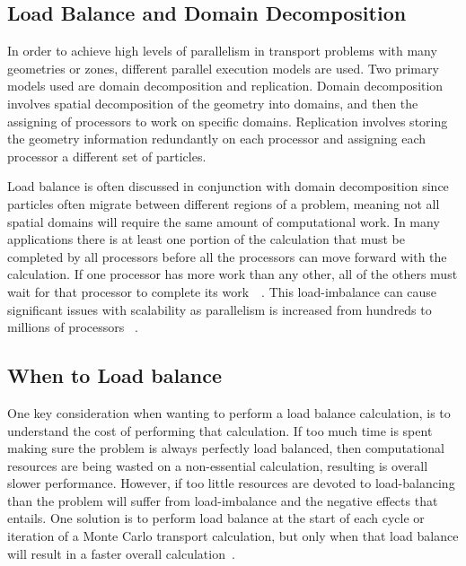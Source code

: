 \subsection{ \textbf{ Load Balance and Domain Decomposition} }

In order to achieve high levels of parallelism in transport problems with many geometries or zones, different parallel execution models are used.
%
Two primary models used are domain decomposition and replication.
%
Domain decomposition involves spatial decomposition of the geometry into domains, and then the assigning of processors to work on specific domains.
%
Replication involves storing the geometry information redundantly on each processor and assigning each processor a different set of particles.
~\cite{procassini2005load}
~\cite{o2005dynamic}


Load balance is often discussed in conjunction with domain decomposition since particles often migrate between different regions of a problem, meaning not all spatial domains will require the same amount of computational work.
%
In many applications there is at least one portion of the calculation that must be completed by all processors before all the processors can move forward with the calculation.
%
If one processor has more work than any other, all of the others must wait for that processor to complete its work~\cite{procassini2005load}~\cite{o2005dynamic}.
%
This load-imbalance can cause significant issues with scalability as parallelism is increased from hundreds to millions of processors ~\cite{o2013scalable}.
%

\subsection*{When to Load balance}

%
One key consideration when wanting to perform a load balance calculation, is to understand the cost of performing that calculation.
%
If too much time is spent making sure the problem is always perfectly load balanced, then computational resources are being wasted on a non-essential calculation, resulting is overall slower performance.
%
However, if too little resources are devoted to load-balancing than the problem will suffer from load-imbalance and the negative effects that entails.
%
One solution is to perform load balance at the start of each cycle or iteration of a Monte Carlo transport calculation, but only when that load balance will result in a faster overall calculation~\cite{o2005dynamic}.
%

